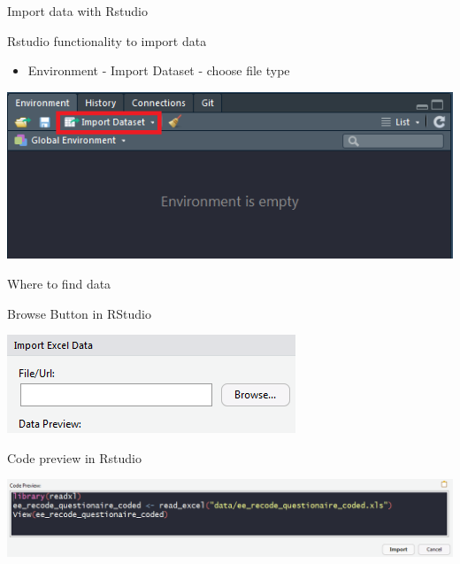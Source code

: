 \documentclass[
  10pt,
  ignorenonframetext,
]{beamer}
\providecommand{\tightlist}{%
  \setlength{\itemsep}{0pt}\setlength{\parskip}{0pt}}
\begin{document}
\begin{frame}{Import data with Rstudio}
\protect\hypertarget{import-data-with-rstudio}{}

\begin{block}{Rstudio functionality to import data}

\begin{itemize}
\tightlist
\item
  Environment - Import Dataset - choose file type
\end{itemize}

\includegraphics{figure/rstudio_import.PNG}

\end{block}

\end{frame}

\begin{frame}{Where to find data}
\protect\hypertarget{where-to-find-data}{}

\begin{block}{Browse Button in RStudio}

\includegraphics{figure/importBrowse.PNG}

\end{block}

\begin{block}{Code preview in Rstudio}

\includegraphics{figure/codepreview.PNG}

\end{block}

\end{frame}
\end{document}
